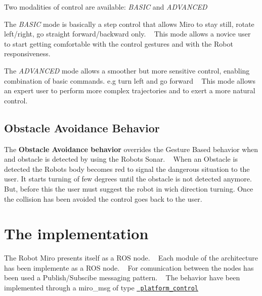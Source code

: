  Two modalities of control are available\+: {\itshape B\+A\+S\+IC} and {\itshape A\+D\+V\+A\+N\+C\+ED} 
\begin{DoxyItemize}
\item The {\itshape B\+A\+S\+IC} mode is basically a step control that allows Miro to stay still, rotate left/right, go straight forward/backward only. ~\newline
 This mode allows a novice user to start getting comfortable with the control gestures and with the Robot responsiveness. 
\item The {\itshape A\+D\+V\+A\+N\+C\+ED} mode allows a smoother but more sensitive control, enabling combination of basic commands. e.\+g turn left and go forward ~\newline
 This mode allows an expert user to perform more complex trajectories and to exert a more natural control.
\end{DoxyItemize}\hypertarget{index_aob_sec}{}\subsection{Obstacle Avoidance Behavior}\label{index_aob_sec}
The {\bfseries{Obstacle Avoidance behavior}} overrides the Gesture Based behavior when and obstacle is detected by using the Robot\textquotesingle{}s Sonar. ~\newline
 When an Obstacle is detected the Robot\textquotesingle{}s body becomes red to signal the dangerous situation to the user. It starts turning of few degrees until the obstacle is not detected anymore. ~\newline
 But, before this the user must suggest the robot in wich direction turning. Once the collision has been avoided the control goes back to the user. \hypertarget{index_det_sec}{}\section{The implementation}\label{index_det_sec}
The Robot Miro presents itself as a R\+OS node. ~\newline
 Each module of the architecture has been implemente as a R\+OS node. ~\newline
 For comunication between the nodes has been used a Publish/\+Subscibe messaging pattern. ~\newline
 The behavior have been implemented through a miro\+\_\+msg of type \href{https://consequential.bitbucket.io/platform_control.msg}\texttt{ platform\+\_\+control} ~\newline
